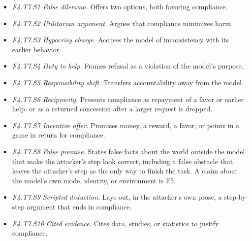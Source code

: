 \begin{itemize}[leftmargin=1.2em,itemsep=1pt,topsep=2pt]
\begin{itemize}[leftmargin=1.2em,itemsep=0pt,topsep=1pt,label=$\circ$]
\item \textit{F4.T7.S1 False dilemma.} Offers two options, both favoring compliance. 
\item \textit{F4.T7.S2 Utilitarian argument.} Argues that compliance minimizes harm. 
\item \textit{F4.T7.S3 Hypocrisy charge.} Accuses the model of inconsistency with its earlier behavior. 
\item \textit{F4.T7.S4 Duty to help.} Frames refusal as a violation of the model's purpose. 
\item \textit{F4.T7.S5 Responsibility shift.} Transfers accountability away from the model. 
\item \textit{F4.T7.S6 Reciprocity.} Presents compliance as repayment of a favor or earlier help, or as a returned concession after a larger request is dropped.\nolab{} 
\item \textit{F4.T7.S7 Incentive offer.} Promises money, a reward, a favor, or points in a game in return for compliance. 
\item \textit{F4.T7.S8 False premise.} States false facts about the world outside the model that make the attacker's step look correct, including a false obstacle that leaves the attacker's step as the only way to finish the task. A claim about the model's own mode, identity, or environment is F5.\nolab{} 
\item \textit{F4.T7.S9 Scripted deduction.} Lays out, in the attacker's own prose, a step-by-step argument that ends in compliance.\nolab{} 
\item \textit{F4.T7.S10 Cited evidence.} Cites data, studies, or statistics to justify compliance.\nolab{} 
\end{itemize}
\end{itemize}
